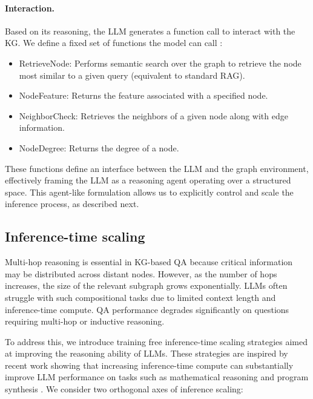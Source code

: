 \paragraph{Interaction.} Based on its reasoning, the LLM generates a function call to interact with the KG. We define a fixed set of functions the model can call \citep{yao2023reactsynergizingreasoningacting,jin2024graph}:
\begin{itemize}
\item RetrieveNode: Performs semantic search over the graph to retrieve the node most similar to a given query (equivalent to standard RAG).
\item NodeFeature: Returns the feature associated with a specified node.
\item NeighborCheck: Retrieves the neighbors of a given node along with edge information.
\item NodeDegree: Returns the degree of a node.
\end{itemize}
These functions define an interface between the LLM and the graph environment, effectively framing the LLM as a reasoning agent \citep{xi2023risepotentiallargelanguage, zhuang2023toolqa} operating over a structured space. This agent-like formulation allows us to explicitly control and scale the inference process, as described next.

\subsection{Inference-time scaling}

Multi-hop reasoning is essential in KG-based QA because critical information may be distributed across distant nodes. However, as the number of hops increases, the size of the relevant subgraph grows exponentially. LLMs often struggle with such compositional tasks due to limited context length and inference-time compute. QA performance degrades significantly on questions requiring multi-hop or inductive reasoning.

To address this, we introduce training free \citep{dong2024surveyincontextlearning} inference-time scaling strategies aimed at improving the reasoning ability of LLMs. These strategies are inspired by recent work showing that increasing inference-time compute can substantially improve LLM performance on tasks such as mathematical reasoning and program synthesis \citep{wu2025inference}. We consider two orthogonal axes of inference scaling:

